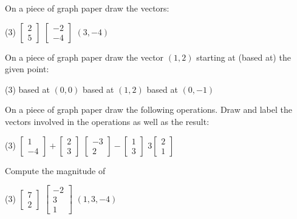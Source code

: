 \begin{exercise}
On a piece of graph paper draw the vectors:
\begin{tasks}(3)
\task
$\begin{bmatrix}
2 \\
5 
\end{bmatrix}
$
\task
$\begin{bmatrix}
-2 \\
-4
\end{bmatrix}
$
\task
$(3,-4)$
\end{tasks}
\end{exercise}

\begin{exercise}
On a piece of graph paper draw the vector $(1,2)$ starting at (based at) the
given point:
\begin{tasks}(3)
\task
based at $(0,0)$
\task
based at $(1,2)$
\task
based at $(0,-1)$
\end{tasks}
\end{exercise}

\begin{exercise}
On a piece of graph paper draw the following
operations.  Draw and label the vectors involved in the operations
as well as the result:
\begin{tasks}(3)
\task
$\begin{bmatrix}
1 \\
-4
\end{bmatrix}
+
\begin{bmatrix}
2 \\
3
\end{bmatrix}$
\task
$\begin{bmatrix}
-3 \\
2
\end{bmatrix}
-
\begin{bmatrix}
1 \\
3
\end{bmatrix}$
\task
$3\begin{bmatrix}
2 \\
1
\end{bmatrix}$
\end{tasks}
\end{exercise}

\begin{exercise}
Compute the magnitude of
\begin{tasks}(3)
\task
$\begin{bmatrix}
7 \\
2 
\end{bmatrix}
$
\task
$\begin{bmatrix}
-2 \\
3 \\
1
\end{bmatrix}
$
\task
$(1,3,-4)$
\end{tasks}
\end{exercise}

